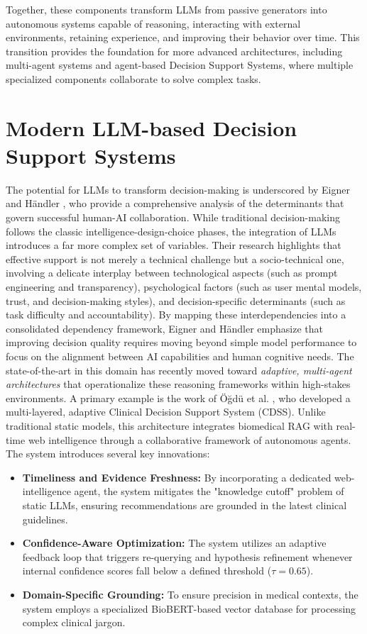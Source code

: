 Together, these components transform LLMs from passive generators into autonomous systems capable of reasoning, interacting with external environments, retaining experience, and improving their behavior over time. This transition provides the foundation for more advanced architectures, including multi-agent systems and agent-based Decision Support Systems, where multiple specialized components collaborate to solve complex tasks.

\section{Modern LLM-based Decision Support Systems}
The potential for LLMs to transform decision-making is underscored by Eigner and Händler \cite{eigner2024determinants}, who provide a comprehensive analysis of the determinants that govern successful human-AI collaboration. While traditional decision-making follows the classic intelligence-design-choice phases, the integration of LLMs introduces a far more complex set of variables. Their research highlights that effective support is not merely a technical challenge but a socio-technical one, involving a delicate interplay between technological aspects (such as prompt engineering and transparency), psychological factors (such as user mental models, trust, and decision-making styles), and decision-specific determinants (such as task difficulty and accountability). By mapping these interdependencies into a consolidated dependency framework, Eigner and Händler emphasize that improving decision quality requires moving beyond simple model performance to focus on the alignment between AI capabilities and human cognitive needs.
The state-of-the-art in this domain has recently moved toward \textit{adaptive, multi-agent architectures} that operationalize these reasoning frameworks within high-stakes environments. A primary example is the work of Öğdü et al. \cite{ougdu2025adaptive}, who developed a multi-layered, adaptive Clinical Decision Support System (CDSS). Unlike traditional static models, this architecture integrates biomedical RAG with real-time web intelligence through a collaborative framework of autonomous agents. The system introduces several key innovations:

\begin{itemize}
    \item \textbf{Timeliness and Evidence Freshness:} By incorporating a dedicated web-intelligence agent, the system mitigates the "knowledge cutoff" problem of static LLMs, ensuring recommendations are grounded in the latest clinical guidelines.
    \item \textbf{Confidence-Aware Optimization:} The system utilizes an adaptive feedback loop that triggers re-querying and hypothesis refinement whenever internal confidence scores fall below a defined threshold ($\tau = 0.65$).
    \item \textbf{Domain-Specific Grounding:} To ensure precision in medical contexts, the system employs a specialized BioBERT-based vector database for processing complex clinical jargon.
\end{itemize}

